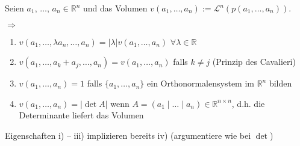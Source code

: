 \begin{proposition}
	Seien $a_1$, $\dotsc$, $a_n\in\mathbb{R}^n$ und das Volumen $v(a_1,\dotsc,a_n) := \mathcal{L}^n(p(a_1,\dotsc,a_n))$.
	
	\hspace*{0.5em}$\Rightarrow$\begin{minipage}[t]{0.8\linewidth}
		\vspace{-0.5\baselineskip}
		\begin{enumerate}[label={\roman*)}]
			\item $v(a_1,\dotsc,\lambda a_n,\dotsc,a_n) = \vert \lambda \vert v(a_1,\dotsc, a_n)$ $\forall \lambda\in\mathbb{R}$
			\item $v(a_1,\dotsc, a_k + a_j,\dotsc, a_n) = v(a_1,\dotsc, a_n)$ falls $k\neq j$ (Prinzip des Cavalieri)
			\item $v(a_1,\dotsc, a_n) = 1$ falls $\{a_1,\dotsc, a_n\}$ ein Orthonormalensystem im $\mathbb{R}^n$ bilden
			\item $v(a_1,\dotsc, a_n) = \vert \det A\vert$ wenn $A = (a_1\mid \dotsc\mid a_n)\in\mathbb{R}^{n\times n}$, d.h. die Determinante liefert das Volumen
		\end{enumerate}
	\end{minipage}
\end{proposition}

\begin{underlinedenvironment}[beachte]
	Eigenschaften i) -- iii) implizieren bereits iv) (argumentiere wie bei $\det$)
\end{underlinedenvironment}

